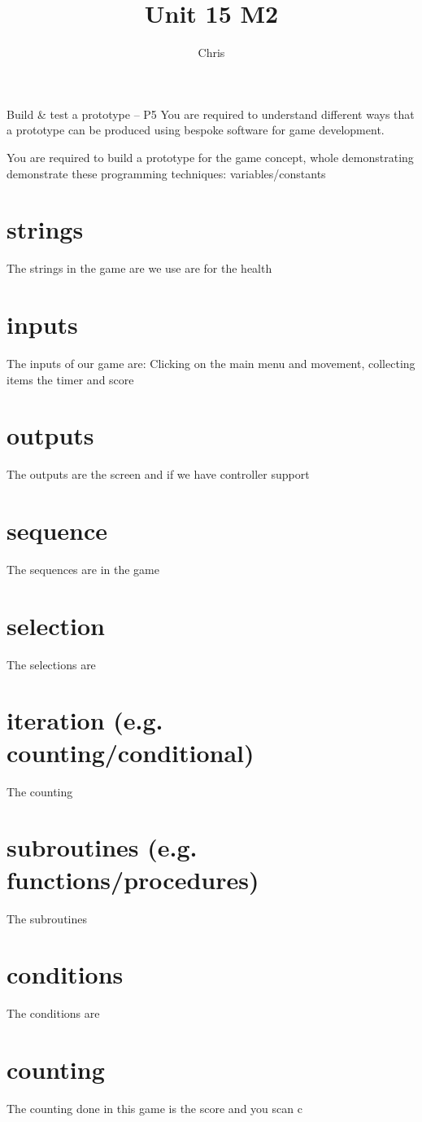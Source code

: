 \documentclass{article}
\title{Unit 15 M2}
\author{Chris}
\date{}
\begin{document}
Build \& test a prototype – P5
You are required to understand different ways that a prototype can be produced using bespoke
software for game development.

You are required to build a prototype for the game concept, whole demonstrating demonstrate
these programming techniques: variables/constants

\section{strings}
The strings in the game are we use are for the health

\section{inputs}
The inputs of our game are: Clicking on the main menu and movement, collecting items the timer and score


\section{outputs}
The outputs are the screen and if we have controller support 

\section{sequence}
The sequences are in the game 

\section{selection}
The selections are 

\section{iteration (e.g. counting/conditional)}
The counting  

\section{subroutines (e.g. functions/procedures)}
The subroutines 

\section{conditions}
The conditions are

\section{counting}
The counting done in this game is the score and you scan c
\end{document}
